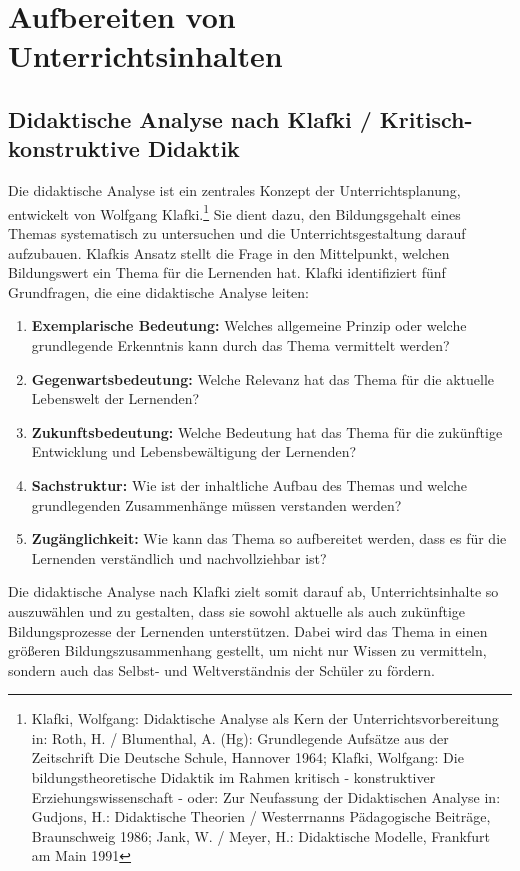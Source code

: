 \chapter{Aufbereiten von Unterrichtsinhalten}\label{Aufbereitung}

\section{Didaktische Analyse nach Klafki / Kritisch-konstruktive Didaktik}

Die didaktische Analyse ist ein zentrales Konzept der Unterrichtsplanung, entwickelt von Wolfgang Klafki.\footnote{Klafki, Wolfgang: Didaktische Analyse als Kern der Unterrichtsvorbereitung in: Roth, H. / Blumenthal, A. (Hg): Grundlegende Aufs\"{a}tze aus der Zeitschrift Die Deutsche Schule, Hannover 1964; Klafki, Wolfgang: Die bildungstheoretische Didaktik im Rahmen kritisch - konstruktiver Erziehungswissenschaft - oder: Zur Neufassung der Didaktischen Analyse in: Gudjons, H.: Didaktische Theorien / Westerrnanns P\"{a}dagogische Beitr\"{a}ge, Braunschweig 1986; Jank, W. / Meyer, H.: Didaktische Modelle, Frankfurt am Main 1991} Sie dient dazu, den Bildungsgehalt eines Themas systematisch zu untersuchen und die Unterrichtsgestaltung darauf aufzubauen. Klafkis Ansatz stellt die Frage in den Mittelpunkt, welchen Bildungswert ein Thema f\"{u}r die Lernenden hat.
\bip
Klafki identifiziert f\"{u}nf Grundfragen, die eine didaktische Analyse leiten:
\begin{enumerate}
\item{\textbf{Exemplarische Bedeutung:} Welches allgemeine Prinzip oder welche grundlegende Erkenntnis kann durch das Thema vermittelt werden?}
\item{\textbf{Gegenwartsbedeutung:} Welche Relevanz hat das Thema f\"{u}r die aktuelle Lebenswelt der Lernenden?}
\item{\textbf{Zukunftsbedeutung:} Welche Bedeutung hat das Thema f\"{u}r die zuk\"{u}nftige Entwicklung und Lebensbew\"{a}ltigung der Lernenden?}
\item{\textbf{Sachstruktur:} Wie ist der inhaltliche Aufbau des Themas und welche grundlegenden Zusammenh\"{a}nge m\"{u}ssen verstanden werden?}
\item{\textbf{Zug\"{a}nglichkeit:} Wie kann das Thema so aufbereitet werden, dass es f\"{u}r die Lernenden verst\"{a}ndlich und nachvollziehbar ist?}
\end{enumerate}

\bip

Die didaktische Analyse nach Klafki zielt somit darauf ab, Unterrichtsinhalte so auszuw\"{a}hlen und zu gestalten, dass sie sowohl aktuelle als auch zuk\"{u}nftige Bildungsprozesse der Lernenden unterst\"{u}tzen. Dabei wird das Thema in einen gr\"{o}{\ss}eren Bildungszusammenhang gestellt, um nicht nur Wissen zu vermitteln, sondern auch das Selbst- und Weltverst\"{a}ndnis der Sch\"{u}ler zu f\"{o}rdern.


